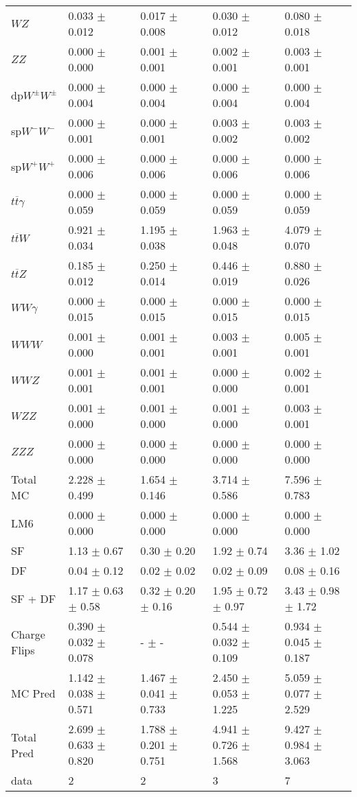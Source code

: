 \begin{tabular}{l | l l l l}
$WZ$ &  0.033 $\pm$  0.012 &  0.017 $\pm$  0.008 &  0.030 $\pm$  0.012 &  0.080 $\pm$  0.018\\
$ZZ$ &   0.000 $\pm$   0.000 &  0.001 $\pm$  0.001 &  0.002 $\pm$  0.001 &  0.003 $\pm$  0.001\\
\hline
dp$W^{\pm}W^{\pm}$ &  0.000 $\pm$  0.004 &  0.000 $\pm$  0.004 &  0.000 $\pm$  0.004 &  0.000 $\pm$  0.004\\
sp$W^{-}W^{-}$ &  0.000 $\pm$  0.001 &  0.000 $\pm$  0.001 &  0.003 $\pm$  0.002 &  0.003 $\pm$  0.002\\
sp$W^{+}W^{+}$ &  0.000 $\pm$  0.006 &  0.000 $\pm$  0.006 &  0.000 $\pm$  0.006 &  0.000 $\pm$  0.006\\
$t\overline{t}\gamma$ &  0.000 $\pm$  0.059 &  0.000 $\pm$  0.059 &  0.000 $\pm$  0.059 &  0.000 $\pm$  0.059\\
$t\overline{t}W$ &  0.921 $\pm$  0.034 &  1.195 $\pm$  0.038 &  1.963 $\pm$  0.048 &  4.079 $\pm$  0.070\\
$t\overline{t}Z$ &  0.185 $\pm$  0.012 &  0.250 $\pm$  0.014 &  0.446 $\pm$  0.019 &  0.880 $\pm$  0.026\\
$WW\gamma$ &  0.000 $\pm$  0.015 &  0.000 $\pm$  0.015 &  0.000 $\pm$  0.015 &  0.000 $\pm$  0.015\\
$WWW$ &  0.001 $\pm$   0.000 &  0.001 $\pm$  0.001 &  0.003 $\pm$  0.001 &  0.005 $\pm$  0.001\\
$WWZ$ &  0.001 $\pm$  0.001 &  0.001 $\pm$  0.001 &   0.000 $\pm$   0.000 &  0.002 $\pm$  0.001\\
$WZZ$ &  0.001 $\pm$   0.000 &  0.001 $\pm$   0.000 &  0.001 $\pm$   0.000 &  0.003 $\pm$  0.001\\
$ZZZ$ &   0.000 $\pm$   0.000 &   0.000 $\pm$   0.000 &   0.000 $\pm$   0.000 &   0.000 $\pm$   0.000\\
\hline
Total MC &  2.228 $\pm$  0.499 &  1.654 $\pm$  0.146 &  3.714 $\pm$  0.586 &  7.596 $\pm$  0.783\\
\hline\hline
\hline
LM6 &  0.000 $\pm$  0.000 &  0.000 $\pm$  0.000 &  0.000 $\pm$  0.000 &  0.000 $\pm$  0.000\\
\hline\hline
\hline\hline
 SF  & 1.13 $\pm$ 0.67 & 0.30 $\pm$ 0.20 & 1.92 $\pm$ 0.74 & 3.36 $\pm$ 1.02\\
 DF  & 0.04 $\pm$ 0.12 & 0.02 $\pm$ 0.02 & 0.02 $\pm$ 0.09 & 0.08 $\pm$ 0.16\\
\hline
 SF + DF  & 1.17 $\pm$ 0.63 $\pm$ 0.58 & 0.32 $\pm$ 0.20 $\pm$ 0.16 & 1.95 $\pm$ 0.72 $\pm$ 0.97 & 3.43 $\pm$ 0.98 $\pm$ 1.72\\
\hline\hline
Charge Flips & 0.390 $\pm$ 0.032 $\pm$ 0.078 & - $\pm$ - & 0.544 $\pm$ 0.032 $\pm$ 0.109 & 0.934 $\pm$ 0.045 $\pm$ 0.187\\
\hline\hline
\hline
MC Pred &  1.142 $\pm$  0.038 $\pm$  0.571 &  1.467 $\pm$  0.041 $\pm$  0.733 &  2.450 $\pm$  0.053 $\pm$  1.225 &  5.059 $\pm$  0.077 $\pm$  2.529\\
\hline\hline
Total Pred &  2.699 $\pm$  0.633 $\pm$  0.820 &  1.788 $\pm$  0.201 $\pm$  0.751 &  4.941 $\pm$  0.726 $\pm$  1.568 &  9.427 $\pm$  0.984 $\pm$  3.063\\
\hline\hline
data & 2 & 2 & 3 & 7\\
\hline\hline
\end{tabular}
